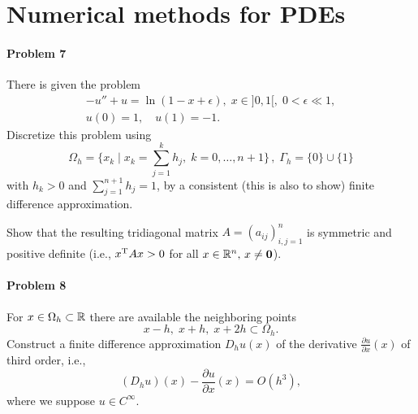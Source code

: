 \section*{Numerical methods for PDEs}
\paragraph{Problem 7}
There is given the problem
\begin{align*}
  -u''  + u = \ln (1-x+\epsilon),\; x\in ]0,1[, \; 0 < \epsilon \ll 1,\\
   u(0) = 1,\quad u(1) = -1.
\end{align*}
Discretize this problem using
\[   \Omega_h = \{ x_k\;|\; x_k = \sum_{j=1}^k h_j,\; k=0,\dots, n+1\} \,,\;
     \Gamma_h = \{ 0\} \cup \{ 1\}   \]
with $h_k > 0$ and $\sum_{j=1}^{n+1} h_j = 1$,
by a consistent (this is also to show) finite difference approximation.

Show that the resulting tridiagonal matrix $A = (a_{ij})_{i,j=1}^n$ is
symmetric and positive definite (i.e., $x^{\text{\upshape T}} A x > 0$ for all $x\in \mathbb{R}^n,\, x\ne \boldsymbol{0}$).
\paragraph{Problem 8}
For $x\in \Omega_h \subset \mathbb{R}$ there are available the
neighboring points
\[
  x-h,\; x+h,\; x+2h \subset \Omega_h.
\]
Construct a finite difference approximation $D_h u(x)$ of the derivative
$\frac{\partial u}{\partial x}(x)$
of third order, i.e.,
\[
(D_h u)(x) - \frac{\partial u}{\partial x}(x) = O (h^3),
\]
where we suppose $u \in C^\infty$.
